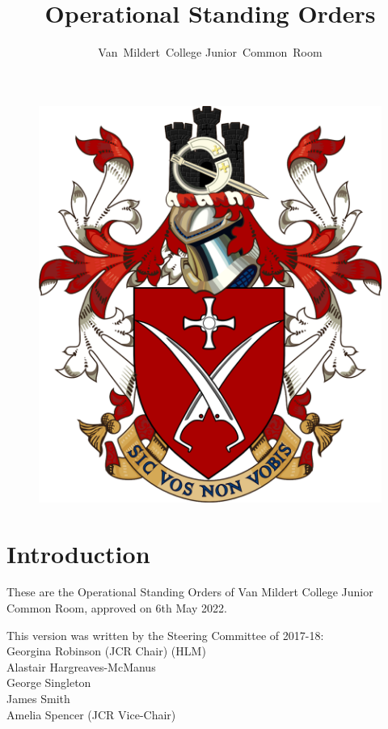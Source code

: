 \documentclass[12pt]{article}
\title{Operational Standing Orders}
\author{Van~Mildert~College Junior~Common~Room}
\date{\thedate}
\newcommand{\thedate}{6th May 2022}
\begin{document}
\begin{titlepage}  %
    \maketitle
    \begin{figure}[h]
    \includegraphics[scale=0.25]{arms}  %
    \centering
    \end{figure}
    \thispagestyle{empty}
\end{titlepage}

\setcounter{page}{2}  %
\section*{Introduction}
These are the Operational Standing Orders of Van Mildert College Junior Common Room, approved on \thedate.

This version was written by the Steering Committee of 2017-18:\\
\hspace*{2cm}Georgina Robinson (JCR Chair) (HLM)\\
\hspace*{2cm}Alastair Hargreaves-McManus\\
\hspace*{2cm}George Singleton\\
\hspace*{2cm}James Smith\\
\hspace*{2cm}Amelia Spencer (JCR Vice-Chair)
\end{document}
